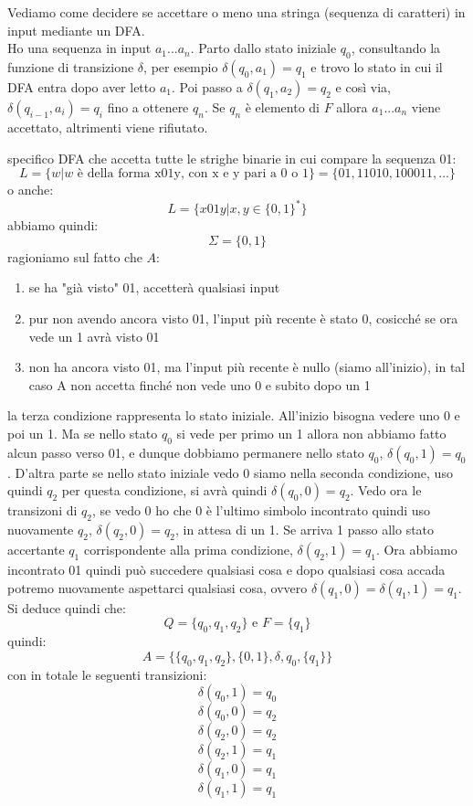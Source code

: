 Vediamo come decidere se accettare o meno una stringa (sequenza di caratteri) in input mediante un DFA.\\
Ho una sequenza in input $a_1...a_n$. Parto dallo stato iniziale $q_0$, consultando la funzione di transizione $\delta$, per esempio  $\delta(q_0,a_1)=q_1$ e trovo lo stato in cui il DFA entra dopo aver letto $a_1$. Poi passo a $\delta(q_1,a_2)=q_2$ e così via, $\delta(q_{i-1},a_i)=q_i$ fino a ottenere $q_n$. Se $q_n$ è elemento di $F$ allora $a_1...a_n$ viene accettato, altrimenti viene rifiutato.
\begin{example}
	specifico DFA che accetta tutte le strighe binarie in cui compare la sequenza 01:
	$$L=\{w|w \mbox{ è della forma x01y, con x e y pari a 0 o 1} \}=\{01,11010,100011,...\}$$
	o anche:
	$$L=\{x01y| x,y\in\{0,1\}^* \}$$
	abbiamo quindi:
	$$\Sigma=\{0,1\}$$
	ragioniamo sul fatto che $A$:
	\begin{enumerate}
		\item se ha "già visto" 01, accetterà qualsiasi input
		\item pur non avendo ancora visto 01, l'input più recente è stato 0, cosicché se ora vede un 1 avrà visto 01
		\item non ha ancora visto 01, ma l'input più recente è nullo (siamo all'inizio), in tal caso A non accetta finché non vede
		      uno 0 e subito dopo un 1
	\end{enumerate}
	la terza condizione rappresenta lo stato iniziale. All'inizio bisogna vedere uno 0 e poi un 1. Ma se nello stato $q_0$ si vede per primo un 1 allora non abbiamo fatto alcun passo verso 01, e dunque dobbiamo permanere nello stato $q_0$, $\delta(q_0,1)=q_0$. D'altra parte se nello stato iniziale vedo 0 siamo nella seconda condizione, uso quindi $q_2$ per questa condizione, si avrà quindi $\delta(q_0,0)=q_2$. Vedo ora le transizoni di $q_2$, se vedo 0 ho che 0 è l'ultimo simbolo incontrato quindi uso nuovamente $q_2$, $\delta(q_2,0)=q_2$, in attesa di un 1. Se arriva 1 passo allo stato accertante $q_1$ corrispondente alla prima condizione, $\delta(q_2,1)=q_1$. Ora abbiamo incontrato 01 quindi può succedere qualsiasi cosa e dopo qualsiasi cosa accada potremo nuovamente aspettarci qualsiasi cosa, ovvero $\delta(q_1,0)=\delta(q_1,1)=q_1$. Si deduce quindi che:
	$$Q=\{q_0,q_1,q_2\} \mbox{ e } F=\{q_1\}$$
	quindi:
	$$A=\{\{q_0,q_1,q_2\} ,\{0,1\}, \delta, q_0, \{q_1\} \}$$
	con in totale le seguenti transizioni:
	$$\delta(q_0,1)=q_0$$
	$$\delta(q_0,0)=q_2$$
	$$\delta(q_2,0)=q_2$$
	$$\delta(q_2,1)=q_1$$
	$$\delta(q_1,0)=q_1$$
	$$\delta(q_1,1)=q_1$$

\end{example}
